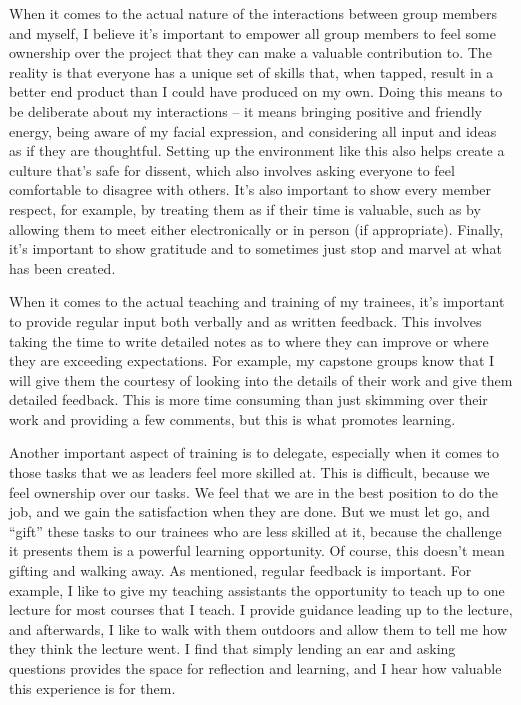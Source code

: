 \documentclass[]{article}
\begin{document}
When it comes to the actual nature of the interactions between group members and myself, I believe it's important to empower all group members to feel some ownership over the project that they can make a valuable contribution to. The reality is that everyone has a unique set of skills that, when tapped, result in a better end product than I could have produced on my own. Doing this means to be deliberate about my interactions -- it means bringing positive and friendly energy, being aware of my facial expression, and considering all input and ideas as if they are thoughtful. Setting up the environment like this also helps create a culture that's safe for dissent, which also involves asking everyone to feel comfortable to disagree with others. It's also important to show every member respect, for example, by treating them as if their time is valuable, such as by allowing them to meet either electronically or in person (if appropriate). Finally, it's important to show gratitude and to sometimes just stop and marvel at what has been created.

When it comes to the actual teaching and training of my trainees, it's important to provide regular input both verbally and as written feedback. This involves taking the time to write detailed notes as to where they can improve or where they are exceeding expectations. For example, my capstone groups know that I will give them the courtesy of looking into the details of their work and give them detailed feedback. This is more time consuming than just skimming over their work and providing a few comments, but this is what promotes learning.

Another important aspect of training is to delegate, especially when it comes to those tasks that we as leaders feel more skilled at. This is difficult, because we feel ownership over our tasks. We feel that we are in the best position to do the job, and we gain the satisfaction when they are done. But we must let go, and ``gift'' these tasks to our trainees who are less skilled at it, because the challenge it presents them is a powerful learning opportunity. Of course, this doesn't mean gifting and walking away. As mentioned, regular feedback is important. For example, I like to give my teaching assistants the opportunity to teach up to one lecture for most courses that I teach. I provide guidance leading up to the lecture, and afterwards, I like to walk with them outdoors and allow them to tell me how they think the lecture went. I find that simply lending an ear and asking questions provides the space for reflection and learning, and I hear how valuable this experience is for them.
\end{document}
